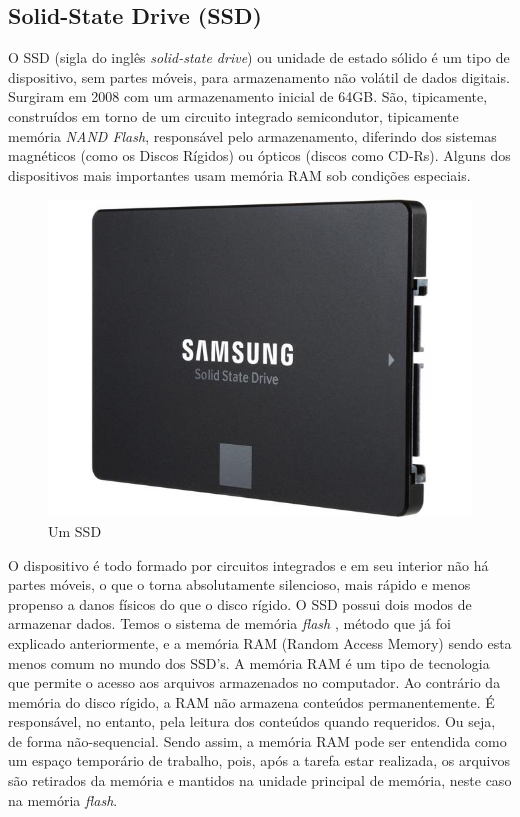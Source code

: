 \documentclass{report}
\begin{document}
\newpage

		\subsection{Solid-State Drive (SSD)}
		
	O SSD (sigla do inglês \textit{solid-state drive}) ou unidade de estado sólido é um tipo de dispositivo, sem partes móveis, para armazenamento não volátil de dados digitais. Surgiram em 2008 com um armazenamento inicial de 64GB. São, tipicamente, construídos em torno de um circuito integrado semicondutor, tipicamente memória \textit{NAND Flash}, responsável pelo armazenamento, diferindo dos sistemas magnéticos (como os Discos Rígidos) ou ópticos (discos como CD-Rs). Alguns dos dispositivos mais importantes usam memória RAM sob condições especiais.
\vspace{5mm}

	\begin{figure} [h]
		\centering
		\includegraphics[scale=0.25]{ssd.jpg}
		\caption{Um SSD}
	\end{figure}
	
\vspace{5mm}	
	
	O dispositivo é todo formado por circuitos integrados e em seu interior não há partes móveis, o que o torna absolutamente silencioso, mais rápido e menos propenso a danos físicos do que o disco rígido.
\vspace{1mm}
	O SSD possui dois modos de armazenar dados. Temos o sistema de memória \textit{flash}  , método que já foi explicado anteriormente, e a memória RAM  (Random Access Memory) sendo esta menos comum no mundo dos SSD's. A memória RAM é um tipo de tecnologia que permite o acesso aos arquivos armazenados no computador. Ao contrário da memória do disco rígido, a RAM não armazena conteúdos permanentemente. É responsável, no entanto, pela leitura dos conteúdos quando requeridos. Ou seja, de forma não-sequencial. Sendo assim, a memória RAM pode ser entendida como um espaço temporário de trabalho, pois, após a tarefa estar realizada, os arquivos são retirados da memória e mantidos na unidade principal de memória, neste caso na memória \textit{flash}.
\vspace{1mm}
	
\end{document}
